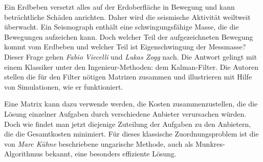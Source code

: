 Ein Erdbeben versetzt alles auf der Erdoberfläche in Bewegung und
kann beträchtliche Schäden anrichten.
Daher wird die seismische Aktivität weiltweit überwacht.
Ein Seismograph enthält eine schwingungsfähige Masse, die die Bewegungen
aufzeichen kann.
Doch welcher Teil der aufgezeichneten Bewegung kommt vom Erdbeben
und welcher Teil ist Eigenschwingung der Messmasse?
Dieser Frage gehen {\em Fabio Viecelli} und {\em Lukas Zogg} nach.
Die Antwort gelingt mit einem Klassiker unter den Ingenieur-Methoden:
dem Kalman-Filter.
Die Autoren stellen die für den Filter nötigen Matrizen zusammen
und illustrieren mit Hilfe von Simulationen, wie er funktioniert.

Eine Matrix kann dazu verwende werden, die Kosten zusammenzustellen,
die die Lösung einzelner Aufgaben durch verschiedene Anbieter
verursachen würden.
Doch wie findet man jetzt diejenige Zuteilung der Aufgaben
zu den Anbietern, die die Gesamtkosten minimiert.
Für dieses klassische Zuordnungsproblem ist die
von {\em Marc Kühne} beschriebene ungarische Methode,
auch als Munkres-Algorithmus bekannt, eine besonders effiziente
Lösung.



